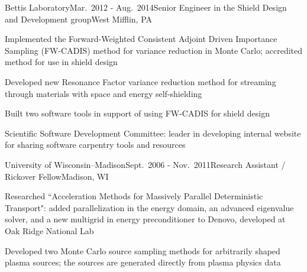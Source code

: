 \begin{rSubsection}{Bettis Laboratory}{Mar.\ 2012 - Aug.\ 2014}{Senior Engineer in the Shield Design and Development group}{West Mifflin, PA}
\item Implemented the Forward-Weighted Consistent Adjoint Driven Importance Sampling (FW-CADIS) method for variance reduction in Monte Carlo; accredited method for use in shield design
\item Developed new Resonance Factor variance reduction method for streaming through materials with space and energy self-shielding
\item Built two software tools in support of using FW-CADIS for shield design
\item Scientific Software Development Committee: leader in developing internal website for sharing software carpentry tools and resources
\end{rSubsection}

\clearpage
\begin{rSubsection}{University of Wisconsin--Madison}{Sept.\ 2006 - Nov.\ 2011}{Research Assistant / Rickover Fellow}{Madison, WI}
\item Researched ``Acceleration Methods for Massively Parallel Deterministic Transport": added parallelization in the energy domain, an advanced eigenvalue solver, and a new multigrid in energy preconditioner to Denovo, developed at Oak Ridge National Lab
\item Developed two Monte Carlo source sampling methods for arbitrarily shaped plasma sources; the sources are generated directly from plasma physics data
\end{rSubsection}



